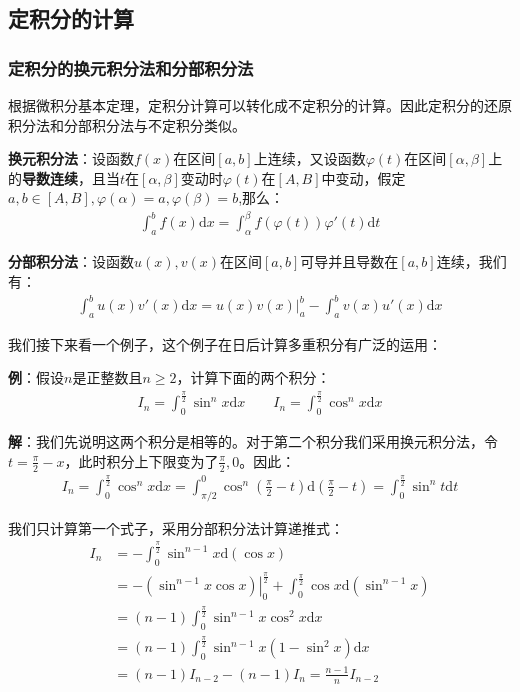 \documentclass{ctexart}
\let\oldtextbf\textbf %
\renewcommand{\textbf}[1]{\textcolor{btex}{\oldtextbf{#1}}} %
\begin{document}
\subsection{定积分的计算}
\subsubsection{定积分的换元积分法和分部积分法}
根据微积分基本定理，定积分计算可以转化成不定积分的计算。因此定积分的还原积分法和分部积分法与不定积分类似。
\begin{tcolorbox}[
    colback=bac2,     %
    colframe=fra2,   %
    coltitle=white,             %
    coltext=tex2,
    title=定积分的换元积分法和分部积分法：,
    fonttitle=\bfseries,        %
arc=3mm,                     %
breakable
]
\textbf{换元积分法}：设函数$f(x)$在区间$[a,b]$上连续，又设函数$\varphi(t)$在区间$[\alpha,\beta]$上的\textbf{导数连续}，且当$t$在$[\alpha,\beta]$变动时$\varphi(t)$在$[A,B]$中变动，假定$a,b\in[A,B],\varphi (\alpha)=a,\varphi(\beta)=b$,那么：
\begin{align*}
    \int_a^b f(x)\mathrm{d}x=\int_\alpha^\beta f(\varphi(t))\varphi'(t)\mathrm{d}t
\end{align*}

\textbf{分部积分法}：设函数$u(x),v(x)$在区间$[a,b]$可导并且导数在$[a,b]$连续，我们有：
\begin{align*}
    \int_a^b u(x)v'(x)\mathrm{d}x=u(x)v(x)|_a^b-\int_a^b v(x)u'(x)\mathrm{d}x
\end{align*}
\end{tcolorbox}

我们接下来看一个例子，这个例子在日后计算多重积分有广泛的运用：

\textbf{例}：假设$n$是正整数且$n\geq 2$，计算下面的两个积分：
\begin{align*}
    I_n=\int_0^\frac{\pi}{2} \sin^n x\mathrm{d}x\qquad I_n=\int_0^\frac{\pi }{2}\cos^n x\mathrm{d}x
\end{align*}

\textbf{解}：我们先说明这两个积分是相等的。对于第二个积分我们采用换元积分法，令$t=\frac{\pi}{2}-x$，此时积分上下限变为了$\frac{\pi}{2},0$。因此：
\begin{align*}
    I_n=\int_0^\frac{\pi }{2}\cos^n x\mathrm{d}x=\int_{\pi/2}^0 \cos^n(\frac{\pi}{2}-t)\mathrm{d}(\frac{\pi}{2}-t)=\int_0^\frac{\pi}{2} \sin^n t\mathrm{d}t
\end{align*}

我们只计算第一个式子，采用分部积分法计算递推式：
\begin{align*}
    I_n&=-\int_0^{\frac{\pi}{2}}\sin^{n-1}x\mathrm{d}(\cos x)\\
&=\left.-(\sin^{n-1}x\cos x)\right|_0^{\frac{\pi}{2}}+\int_0^{\frac{\pi}{2}}\cos x\mathrm{d}(\sin^{n-1}x)\\
&=(n-1) \int_0^{\frac{\pi}{2}}\sin^{n-1}x\cos^2 x\mathrm{d}x\\
&=(n-1) \int_0^{\frac{\pi}{2}}\sin^{n-1}x(1-\sin^2x)\mathrm{d}x\\
&=(n-1)I_{n-2}-(n-1)I_n=\frac{n-1}{n}I_{n-2}
\end{align*}
\end{document}
